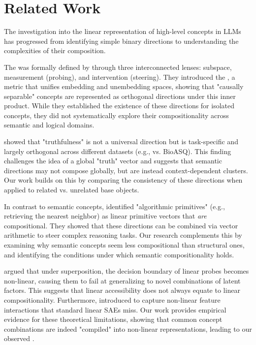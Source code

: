 \section{Related Work}
\label{sec:related_work}

The investigation into the linear representation of high-level concepts in LLMs has progressed from identifying simple binary directions to understanding the complexities of their composition.

 The \lrh was formally defined by \citet{park2023linear} through three interconnected lenses: subspace, measurement (probing), and intervention (steering). They introduced the \cip, a metric that unifies embedding and unembedding spaces, showing that "causally separable" concepts are represented as orthogonal directions under this inner product. While they established the existence of these directions for isolated concepts, they did not systematically explore their compositionality across semantic and logical domains.

 \citet{azizian2025geometries} showed that "truthfulness" is not a universal direction but is task-specific and largely orthogonal across different datasets (e.g., \triviaqa vs. BioASQ). This finding challenges the idea of a global "truth" vector and suggests that semantic directions may not compose globally, but are instead context-dependent clusters. Our work builds on this by comparing the consistency of these directions when applied to related vs. unrelated base objects.

 In contrast to semantic concepts, \citet{lippl2025algorithmic} identified "algorithmic primitives" (e.g., retrieving the nearest neighbor) as linear primitive vectors that \textit{are} compositional. They showed that these directions can be combined via vector arithmetic to steer complex reasoning tasks. Our research complements this by examining why semantic concepts seem less compositional than structural ones, and identifying the conditions under which semantic compositionality holds.

 \citet{pacela2026stop} argued that under superposition, the decision boundary of linear probes becomes non-linear, causing them to fail at generalizing to novel combinations of latent factors. This suggests that linear accessibility does not always equate to linear compositionality. Furthermore, \citet{koromilas2026polysae} introduced \polysae to capture non-linear feature interactions that standard linear SAEs miss. Our work provides empirical evidence for these theoretical limitations, showing that common concept combinations are indeed "compiled" into non-linear representations, leading to our observed \consistencyparadox.
